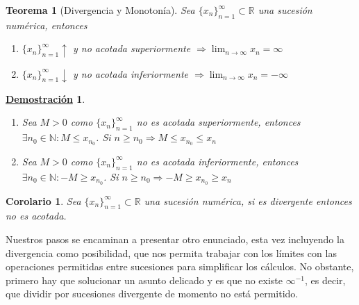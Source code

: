 \documentclass[10pt,a4paper,openright]{book}
\theoremstyle{break}
\newtheorem{theo}{Teorema}[chapter]
\newtheorem{coro}{Corolario}[theo]
\newtheorem*{demo}{\underline{Demostración}}
\begin{document}
\begin{theo}[Divergencia y Monotonía]
Sea $\{x_n\}_{n=1}^\infty\subset \mathbb R$ una sucesión numérica, entonces
\begin{enumerate}
\item $\{x_n\}_{n=1}^\infty \uparrow$ y no acotada superiormente $\Rightarrow \lim_{n\rightarrow \infty} x_n=\infty$

\item $\{x_n\}_{n=1}^\infty \downarrow$ y no acotada inferiormente $\Rightarrow \lim_{n\rightarrow \infty} x_n=-\infty$
\end{enumerate}
\end{theo}
\begin{demo}
\begin{enumerate}
\item Sea $M>0$ como $\{x_n\}_{n=1}^\infty $ no es acotada superiormente, entonces $\exists n_0\in \mathbb N: M\leq x_{n_0}$. Si $n\geq n_0\Rightarrow M\leq x_{n_0}\leq x_n$

\item Sea $M>0$ como $\{x_n\}_{n=1}^\infty $ no es acotada inferiormente, entonces $\exists n_0\in \mathbb N: -M\geq x_{n_0}$. Si $n\geq n_0\Rightarrow -M\geq x_{n_0}\geq x_n$
\end{enumerate}
\end{demo}

\begin{coro}
Sea $\{x_n\}_{n=1}^\infty\subset \mathbb R$ una sucesión numérica, si es divergente entonces no es acotada.
\end{coro}

Nuestros pasos se encaminan a presentar otro enunciado, esta vez incluyendo la divergencia como posibilidad, que nos permita trabajar con los límites con las operaciones permitidas entre sucesiones para simplificar los cálculos. No obstante, primero hay que solucionar un asunto delicado y es que no existe $\infty^{-1}$, es decir, que dividir por sucesiones divergente de momento no está permitido.
\end{document}
